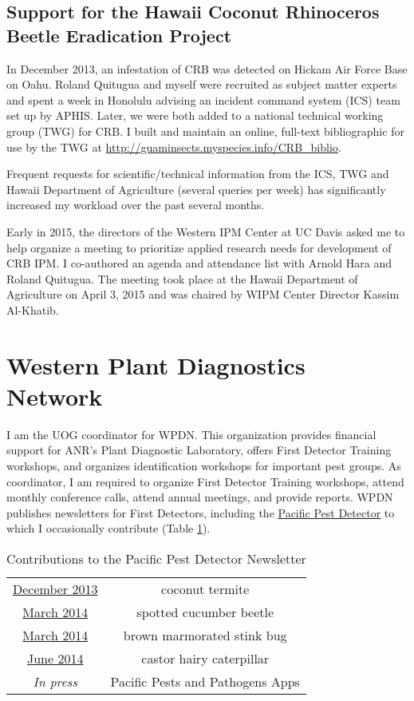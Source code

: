 \documentclass[12pt,oneside,english]{scrbook}
\begin{document}
\subsection{\label{sub:Hawaii CRB}Support for the Hawaii Coconut Rhinoceros Beetle Eradication Project}

In December 2013, an infestation of CRB was detected on Hickam Air
Force Base on Oahu. Roland Quitugua and myself were recruited as subject
matter experts and spent a week in Honolulu advising an incident command
system (ICS) team set up by APHIS. Later, we were both added to a
national technical working group (TWG) for CRB. I built and maintain
an online, full-text bibliographic for use by the TWG at \url{http://guaminsects.myspecies.info/CRB_biblio}.

Frequent requests for scientific/technical information from the ICS,
TWG and Hawaii Department of Agriculture (several queries per week)
has significantly increased my workload over the past several months.

Early in 2015, the directors of the Western IPM Center at UC Davis asked me to help organize a meeting to prioritize applied research needs for development of CRB IPM. I co-authored an agenda and attendance list with Arnold Hara and Roland Quitugua. The meeting took place at the Hawaii Department of Agriculture on April 3, 2015 and was chaired by WIPM Center Director Kassim Al-Khatib.

\section{Western Plant Diagnostics Network}

I am the UOG coordinator for WPDN. This organization provides financial
support for ANR's Plant Diagnostic Laboratory, offers First Detector
Training workshops, and organizes identification workshops for important
pest groups. As coordinator, I am required to organize First Detector
Training workshops, attend monthly conference calls, attend annual
meetings, and provide reports.
WPDN publishes newsletters for First Detectors, including the \href{https://www.wpdn.org/ppd_newsletter_archive}{Pacific Pest Detector} to which I occasionally contribute (Table \ref{tab:PFD}).

\begin{table}[h]
\protect\caption{\label{tab:PFD}Contributions to the Pacific Pest Detector Newsletter}
\centering{}%
\begin{tabular}{cc}
\hline 
\href{https://www.wpdn.org/webfm_send/514}{December 2013} & coconut termite\tabularnewline
\href{https://www.wpdn.org/webfm_send/511}{March 2014} & spotted cucumber beetle\tabularnewline
\href{https://www.wpdn.org/webfm_send/511}{March 2014} & brown marmorated stink bug \tabularnewline
\href{https://www.wpdn.org/webfm_send/514}{June 2014} & castor hairy caterpillar\tabularnewline
\emph{In press} & Pacific Pests and Pathogens Apps\tabularnewline
\hline 
\end{tabular}
\end{table}
\end{document}
